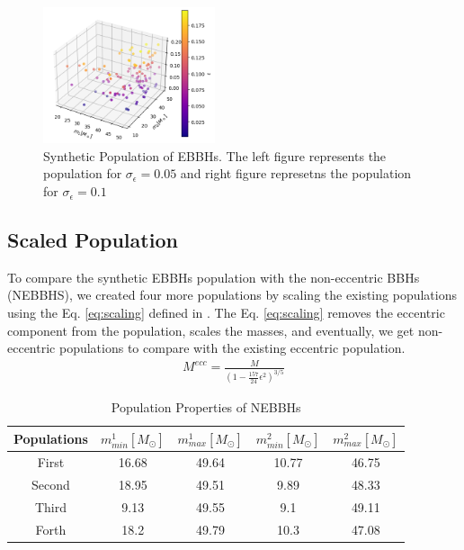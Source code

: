 \documentclass[twocolumn,prd,nofootinbib]{revtex4}
\begin{document}
\begin{figure}[H]

\includegraphics[width=0.45\textwidth]{paper/figures/pop3d0.2.png}
\caption{\label{fig:pop3d0.2} Synthetic Population of EBBHs. The left figure represents the population for $\sigma_\epsilon=0.05$ and right figure represetns the population for $\sigma_\epsilon=0.1$}

\end{figure}


\subsection{Scaled Population}

To compare the synthetic EBBHs population with the non-eccentric BBHs (NEBBHS), we created four more populations by scaling the existing populations using the Eq. \ref{eq:scaling} defined in \cite{2021_scaling_paper}. The Eq. \ref{eq:scaling} removes the eccentric component from the population, scales the masses, and eventually, we get non-eccentric populations to compare with the existing eccentric population.
\begin{align}
\label{eq:scaling}
M^{ecc} = \frac{M}{(1-\frac{157}{24}\epsilon^2)^{3/5}}
\end{align}




\begin{table}[]
    \centering
    \begin{tabular}{c|cccc}
        \hline
        Populations & $m^1_{min} [M_\odot] $ & $m^1_{max} [M_\odot]$ & $m^2_{min} [M_\odot]$ & $m^2_{max} [M_\odot]$ \\ \hline
        First & 16.68 & 49.64 & 10.77 & 46.75 \\ \hline
        Second & 18.95 & 49.51 & 9.89 & 48.33 \\ \hline
        Third & 9.13 & 49.55 & 9.1 & 49.11  \\ \hline
        Forth & 18.2 & 49.79 & 10.3 & 47.08  \\ \hline
    \end{tabular}
    \caption{Population Properties of NEBBHs}
    \label{tab:popscl_prop}
\end{table}
 
\end{document}
